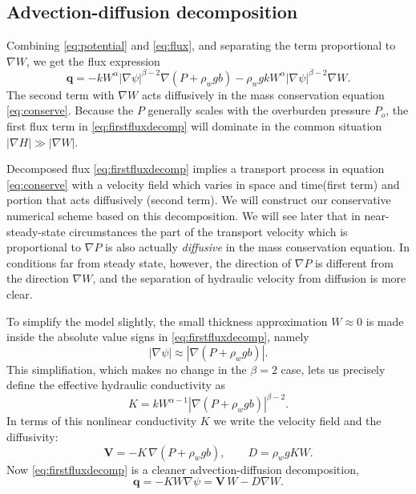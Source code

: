 \documentclass[11pt,final]{amsart}
\newcommand\bV{\mathbf{V}}
\newcommand\bq{\mathbf{q}}
\newcommand{\grad}{\nabla}
\begin{document}
\subsection*{Advection-diffusion decomposition}  Combining \eqref{eq:potential} and \eqref{eq:flux}, and separating the term proportional to $\grad W$, we get the flux expression
\begin{equation}
  \bq = - k  W^\alpha \left|\grad \psi\right|^{\beta-2} \grad \left(P + \rho_w g b\right)   - \rho_w g k W^\alpha \left|\grad \psi\right|^{\beta-2} \grad W. \label{eq:firstfluxdecomp}
\end{equation}
The second term with $\grad W$ acts diffusively in the mass conservation equation \eqref{eq:conserve}.  Because the $P$ generally scales with the overburden pressure $P_o$, the first flux term in \eqref{eq:firstfluxdecomp} will dominate in the common situation $|\grad H| \gg |\grad W|$.

Decomposed flux \eqref{eq:firstfluxdecomp} implies a transport process in equation \eqref{eq:conserve} with a velocity field which varies in space and time(first term) and portion that acts diffusively (second term).  We will construct our conservative numerical scheme based on this decomposition.  We will see later that in near-steady-state circumstances the part of the transport velocity which is proportional to $\grad P$ is also actually \emph{diffusive} in the mass conservation equation.  In conditions far from steady state, however, the direction of $\grad P$ is different from the direction $\grad W$, and the separation of hydraulic velocity from diffusion is more clear.

To simplify the model slightly, the small thickness approximation $W\approx 0$ is made inside the absolute value signs in \eqref{eq:firstfluxdecomp}, namely
\begin{equation}
\left|\grad \psi\right| \approx \left|\grad \left(P + \rho_w g b \right)\right|.  \label{eq:Wsmall}
\end{equation}
This simplifiation, which makes no change in the $\beta=2$ case, lets us precisely define the effective hydraulic conductivity as
\begin{equation}
K = k W^{\alpha-1} \left|\grad(P+\rho_w g b)\right|^{\beta - 2}. \label{eq:Kdefine}
\end{equation}
In terms of this nonlinear conductivity $K$ we write the velocity field and the diffusivity:
\begin{equation} \label{eq:vexpression}
  \bV = - K\, \grad \left(P + \rho_w g b\right), \qquad D = \rho_w g K W.
\end{equation}
Now \eqref{eq:firstfluxdecomp} is a cleaner advection-diffusion decomposition,
\begin{equation} \label{eq:qexpression}
  \bq = - K W \grad \psi = \bV\, W - D \grad W.
\end{equation}
\end{document}
